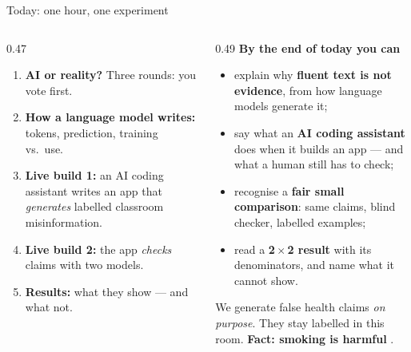\begin{frame}{Today: one hour, one experiment}
  \begin{columns}[T]
    \begin{column}{0.47\textwidth}
      \begin{readme}
        \footnotesize
        \begin{enumerate}\setlength{\itemsep}{1pt}
          \item \textbf{AI or reality?} Three rounds: you vote first.
          \item \textbf{How a language model writes:} tokens, prediction, training vs.\ use.
          \item \textbf{Live build 1:} an AI coding assistant writes an app that \emph{generates} labelled classroom misinformation.
          \item \textbf{Live build 2:} the app \emph{checks} claims with two models.
          \item \textbf{Results:} what they show --- and what not.
        \end{enumerate}
      \end{readme}
    \end{column}
    \begin{column}{0.49\textwidth}
      \footnotesize
      \textbf{By the end of today you can}
      \begin{itemize}\setlength{\itemsep}{2pt}
        \item explain why \textbf{fluent text is not evidence}, from how language models generate it;
        \item say what an \textbf{AI coding assistant} does when it builds an app --- and what a human still has to check;
        \item recognise a \textbf{fair small comparison}: same claims, blind checker, labelled examples;
        \item read a \textbf{2\,$\times$\,2 result} with its denominators, and name what it cannot show.
      \end{itemize}
      \begin{mistake}
        We generate false health claims \emph{on purpose}. They stay labelled in this room.
        \textbf{Fact: smoking is harmful} \parencite{who2026tobacco}.
      \end{mistake}
    \end{column}
  \end{columns}
\end{frame}

